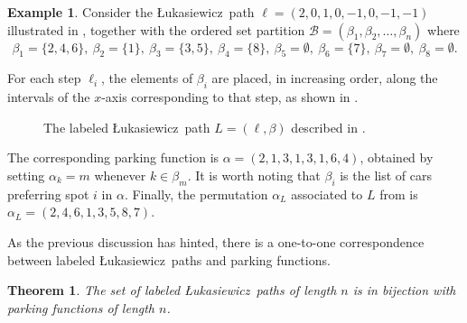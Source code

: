 \documentclass[12pt,reqno]{amsart}
\newtheorem{theorem}{Theorem}[section]
\theoremstyle{definition}
\newtheorem{example}{Example}
\theoremstyle{remark}
\newcommand{\x}{\textbf{x}}
\newcommand{\Luka}{\L ukasiewicz}
\newcommand{\tb}[1]{{\bf\color{blue}{#1}}}
\begin{document}
\begin{example}\label{ex:Luka to pf}
Consider the \Luka~path  \(\ell = (2,0,1,0,-1,0,-1,-1)\) illustrated in , together with the ordered set partition  $\mathcal{B}= (\beta_1,\beta_2,\ldots, \beta_n)$ where
\[
\beta_1 = \{2,4,6\}, \ \beta_2 = \{1\}, \ \beta_3 = \{3,5\}, \ \beta_4 = \{8\}, \ \beta_5 = \emptyset, \ \beta_6 = \{7\}, \ \beta_7 = \emptyset, \ \beta_8 = \emptyset.
\]  

For each step $\ell_i$, the elements of $\beta_i$ are placed, in increasing order, along the intervals of the $x$-axis corresponding to that step, as shown in .  

    \begin{figure}[ht]
    \centering
    \caption{The labeled \Luka~path $L=(\ell,\beta)$ described in .}
    \label{fig:Lukapath2}
\end{figure}

The corresponding parking function is  \(\alpha = (2,1,3,1,3,1,6,4)\),
obtained by setting $\alpha_k = m$ whenever $k \in \beta_m$.  It is worth noting that $\beta_i$ is the list of cars preferring spot $i$ in $\alpha$.   Finally, the permutation $\alpha_L$ associated to $L$ from  is  \( \alpha_L = (2,4,6,1,3,5,8,7)\).
\end{example}

As the previous discussion has hinted, there is a one-to-one correspondence between labeled \L{}ukasiewicz~paths and parking functions. 
\begin{theorem}{\cite{SZ}}
\label{thm:labeled luka bijection to PFs}
    The set of labeled \Luka~paths of length $n$ is in bijection with parking functions of length $n$.
\end{theorem}
\end{document}
